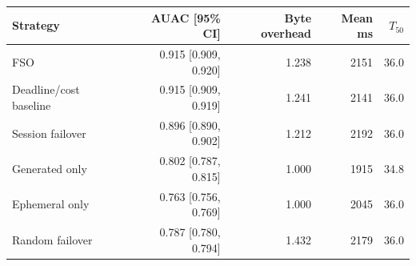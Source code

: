 \begin{tabular}{lrrrr}
\toprule
Strategy & AUAC [95\% CI] & Byte overhead & Mean ms & $T_{50}$ \\
\midrule
FSO & 0.915 [0.909, 0.920] & 1.238 & 2151 & 36.0 \\
Deadline/cost baseline & 0.915 [0.909, 0.919] & 1.241 & 2141 & 36.0 \\
Session failover & 0.896 [0.890, 0.902] & 1.212 & 2192 & 36.0 \\
Generated only & 0.802 [0.787, 0.815] & 1.000 & 1915 & 34.8 \\
Ephemeral only & 0.763 [0.756, 0.769] & 1.000 & 2045 & 36.0 \\
Random failover & 0.787 [0.780, 0.794] & 1.432 & 2179 & 36.0 \\
\bottomrule
\end{tabular}
